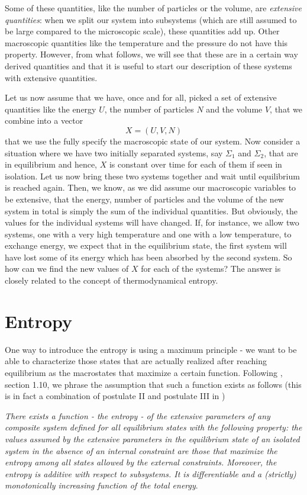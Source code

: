 \documentclass[a4paper, draft]{article}
\theoremstyle{own}
\theoremstyle{remark}
\begin{document}
Some of these quantities, like the number of particles or the volume, are {\em extensive quantities}: when we split our system into subsystems (which are still assumed to be large compared to the microscopic scale), these quantities add up. Other macroscopic quantities like the temperature and the pressure do not have this property. However, from what follows, we will see that these are in a certain way derived quantities and that it is useful to start our description of these systems with extensive quantities.

Let us now assume that we have, once and for all, picked a set of extensive quantities like the energy $U$, the number of particles $N$ and the volume $V$, that we combine into a vector
$$
X = (U,V,N)
$$
that we use the fully specify the macroscopic state of our system. Now consider a situation where we have two initially separated systems, say $\Sigma_1$ and $\Sigma_2$, that are in equilibrium and hence, $X$ is constant over time for each of them if seen in isolation. Let us now bring these two systems together and wait until equilibrium is reached again. Then, we know, as we did assume our macroscopic variables to be extensive, that the energy, number of particles and the volume of the new system in total is simply the sum of the individual quantities. But obviously, the values for the individual systems will have changed. If, for instance, we allow two systems, one with a very high temperature and one with a low temperature, to exchange energy, we expect that in the equilibrium state, the first system will have lost some of its energy which has been absorbed by the second system. So how can we find the new values of $X$ for each of the systems? The answer is closely related to the concept of thermodynamical entropy.

\section{Entropy}

One way to introduce the entropy is using a maximum principle - we want to be able to characterize those states that are actually realized after reaching equilibrium as the macrostates that maximize a certain function. Following 
\cite{Callen}, section 1.10, we phrase the assumption that such a function exists as follows (this is in fact a combination of postulate II and postulate III in \cite{Callen})

{\em There exists a function - the entropy - of the extensive parameters of any composite system defined for all equilibrium states with the following property: the values assumed by the extensive parameters in the equilibrium state of an isolated system in the absence of an internal constraint are those that maximize the entropy among all states allowed by the external constraints. Moreover, the entropy is additive with respect to subsystems. It is differentiable and a (strictly) monotonically increasing function of the total energy}.
	
\end{document}
